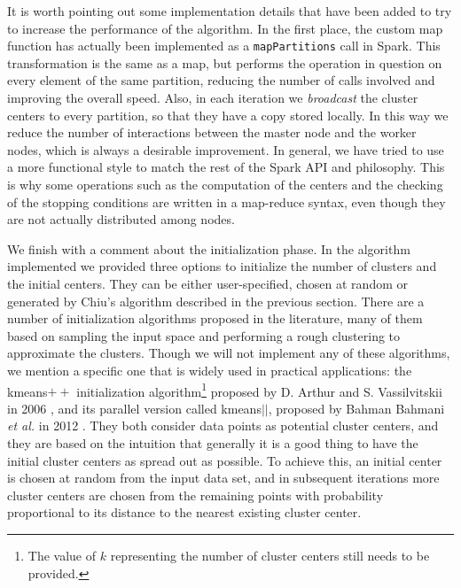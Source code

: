 It is worth pointing out some implementation details that have been added to try to increase the performance of the algorithm. In the first place, the custom map function has actually been implemented as a \verb|mapPartitions| call in Spark. This transformation is the same as a map, but performs the operation in question on every element of the same partition, reducing the number of calls involved and improving the overall speed. Also, in each iteration we \textit{broadcast} the cluster centers to every partition, so that they have a copy stored locally. In this way we reduce the number of interactions between the master node and the worker nodes, which is always a desirable improvement. In general, we have tried to use a more functional style to match the rest of the Spark API and philosophy. This is why some operations such as the computation of the centers and the checking of the stopping conditions are written in a map-reduce syntax, even though they are not actually distributed among nodes.

We finish with a comment about the initialization phase. In the algorithm implemented we provided three options to initialize the number of clusters and the initial centers. They can be either user-specified, chosen at random or generated by Chiu's algorithm described in the previous section. There are a number of initialization algorithms proposed in the literature, many of them based on sampling the input space and performing a rough clustering to approximate the clusters. Though we will not implement any of these algorithms, we mention a specific one that is widely used in practical applications: the kmeans$++$ initialization algorithm\footnote{The value of $k$ representing the number of cluster centers still needs to be provided.} proposed by D. Arthur and S. Vassilvitskii in 2006 \cite{arthur2006k}, and its parallel version called kmeans$||$, proposed by Bahman Bahmani \textit{et al.} in 2012 \cite{bahmani2012scalable}. They both consider data points as potential cluster centers, and they are based on the intuition that generally it is a good thing to have the initial cluster centers as spread out as possible. To achieve this, an initial center is chosen at random from the input data set, and in subsequent iterations more cluster centers are chosen from the remaining points with probability proportional to its distance to the nearest existing cluster center.
